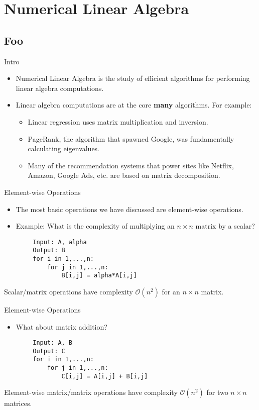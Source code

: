 \documentclass[serif,xcolor=pdftex,dvipsnames,table,hyperref={bookmarks=false,breaklinks}]{beamer}
\begin{document}
\section{Numerical Linear Algebra}
\subsection{Foo}

\begin{frame}[t]{Intro}
	\begin{itemize}[<+->]
		\item Numerical Linear Algebra is the study of efficient algorithms for performing linear algebra computations.
		\item Linear algebra computations are at the core \textbf{many} algorithms. For example:
		\begin{itemize}[<+->]
			\item Linear regression uses matrix multiplication and inversion.
			\item PageRank, the algorithm that spawned Google, was fundamentally calculating eigenvalues.
			\item Many of the recommendation systems that power sites like Netflix, Amazon, Google Ads, etc. are based on matrix decomposition.
		\end{itemize}
	\end{itemize}
\end{frame}

\begin{frame}[t,fragile]{Element-wise Operations}
	\begin{itemize}[<+->]
		\item The most basic operations we have discussed are element-wise operations.
		\item Example: What is the complexity of multiplying an $n\times n$ matrix by a scalar?
	\end{itemize}
	
	\pause
	\begin{lstlisting}
		Input: A, alpha
		Output: B
		for i in 1,...,n:
		    for j in 1,...,n:
		        B[i,j] = alpha*A[i,j]
	\end{lstlisting}
	
	\pause
	Scalar/matrix operations have complexity $\mathcal{O}(n^2)$ for an $n\times n$ matrix.
\end{frame}

\begin{frame}[t,fragile]{Element-wise Operations}
	\begin{itemize}[<+->]
		\item What about matrix addition?
	\end{itemize}
	
	\pause
	\begin{lstlisting}
		Input: A, B
		Output: C
		for i in 1,...,n:
		    for j in 1,...,n:
		        C[i,j] = A[i,j] + B[i,j]
	\end{lstlisting}
	
	\pause
	Element-wise matrix/matrix operations have complexity $\mathcal{O}(n^2)$ for two $n\times n$ matrices.
\end{frame}
\end{document}
